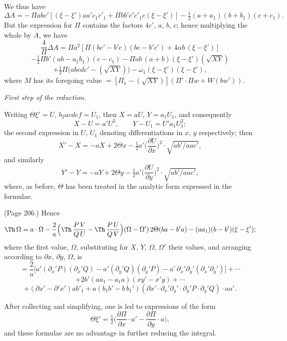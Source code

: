 \documentclass[11pt,a4paper]{book}
\begin{document}
We thus have
\[
\Delta A = -\,\Pi a b c' [(\xi - \xi') a a' c_1 c'_1 + \Pi b b' c' c'_1 c (\xi - \xi')] - \tfrac{1}{2}(a + a_1)(b + b_1) (c + c_1).
\]
But the expression for $\Pi$ contains the factors $4 c'$, $a$, $b$, $c$; hence multiplying the whole by $A$, we have
\[
\frac{4}{\Pi} \Delta A = \Pi a^2 [\Pi (b c' - b' c)(b c - b' c') + 4 \alpha b\,(\xi - \xi')]
\]
\[
- \tfrac{1}{2}\Pi b' (a b - a_1 b_1)(c - c_1) - \Pi a b\,(a + b) (\xi - \xi') (\sqrt{X Y})
\]
\[
+ \tfrac{1}{2}\Pi \big(abc d c' - (\sqrt{X Y})\big) - \omega_1 (\xi - \xi') (\xi - \xi'),
\]
where $M$ has its foregoing value $= [\Pi_1 - (\sqrt{X Y})] (\Pi' \cdot \Pi w + W (b w'))$.

\medskip

\noindent \emph{First step of the reduction.}

Writing $\Theta \xi' = U$, $b_2 a c d e f = U_1$, then $X = a U$, $Y = a_1 U_1$, and consequently
\[
X - U = a' U^2, \qquad Y - U_1 = U' a_1 U_1^2;
\]
the second expression in $U$, $U_1$ denoting differentiations in $x$, $y$ respectively; then
\[
X' - X = - a X + 2 \Theta x - \tfrac{1}{2} a' \big(\frac{\partial U}{\partial x}\big)^2 \cdot \sqrt{a b' / a a c'},
\]
and similarly
\[
Y' - Y = - a Y + 2 \Theta y - \tfrac{1}{2} a' \big(\frac{\partial U}{\partial y}\big)^2 \cdot \sqrt{a b' / a a c'},
\]
where, as before, $\Theta$ has been treated in the analytic form expressed in the formulae.

\medskip

\noindent (Page 206.) Hence
\[
\Th\,\Omega = a \cdot \Omega - \frac{2}{a}\Big(\Th\,\frac{P\,V}{Q\,U} - \Th\,\frac{P\,U}{Q\,V}\Big)(\Omega - \Omega')\,2\Theta(b a - b' a) - (a a_1)(b - b')(\xi - \xi');
\]
where the first value, $\Omega$, substituting for $X$, $Y$, $\Omega$, $\Omega'$ their values, and arranging according to $\partial x$, $\partial y$, $\Omega$, is
\[
= \frac{2}{a} \Big[ a' (\partial_x' P)(\partial_x' Q) - a' (\partial_y' Q)(\partial_y' P) - a'\,\partial_x' \partial_y' (\partial_x'\partial_y')\Big] + \cdots
\]
\[
+ 2 b' (a a_1 - a_1 a) (x y' - x' y) + \cdots
\]
\[
+ (\partial x' - \partial' x') a b'_1 + a (b_1 b' - b\,b_1') (\partial x' \cdot \partial_x' \partial_y' \cdot \partial_y' P \cdot \partial_y' Q) \cdot a a'.
\]
\medskip

After collecting and simplifying, one is led to expressions of the form
\[
\Theta \xi' = \tfrac{1}{2} \big(\frac{\partial \Pi}{\partial x} \cdot a' - \frac{\partial \Pi}{\partial y} \cdot a\big),
\]
and these formulae are no advantage in further reducing the integral.
\end{document}
